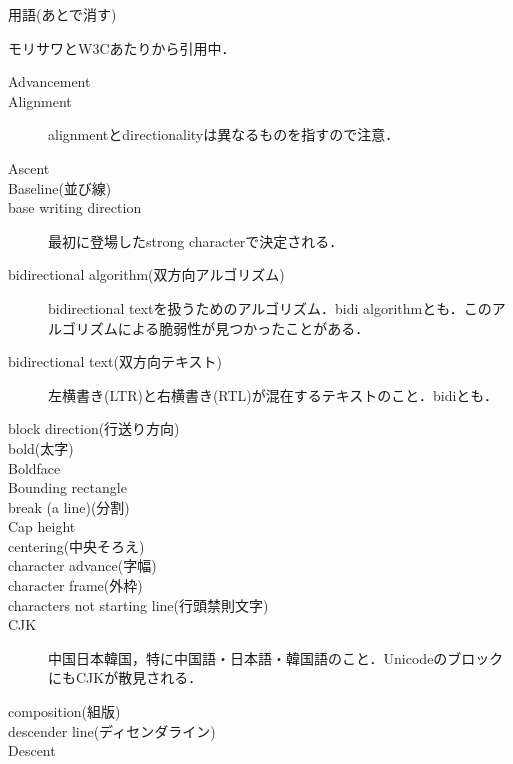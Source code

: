 用語(あとで消す)

モリサワとW3C\cite{www.w3.org:TR/2011/WD-jlreq-20111129/ja/}あたりから引用中．

\begin{description}
    \item[Advancement]
    \item[Alignment] alignmentとdirectionalityは異なるものを指すので注意\cite{developer.apple.com:videos/play/wwdc2016/232/}．
    \item[Ascent]
    \item[Baseline(並び線)]
    \item[base writing direction] 最初に登場したstrong characterで決定される\cite{developer.apple.com:videos/play/wwdc2016/232/}\cite{unicode.org:reports/tr9/}．
    \item[bidirectional algorithm(双方向アルゴリズム)] bidirectional textを扱うためのアルゴリズム\cite{www.w3.org:International/articles/inline-bidi-markup/uba-basics}．bidi algorithmとも．このアルゴリズムによる脆弱性が見つかったことがある\cite{jvndb.jvn.jp:ja/contents/2010/JVNDB-2010-002420.html}．
    \item[bidirectional text(双方向テキスト)] 左横書き(LTR)と右横書き(RTL)が混在するテキストのこと\cite{www.w3.org:International/articles/inline-bidi-markup/uba-basics}．bidiとも．
    \item[block direction(行送り方向)]
    \item[bold(太字)]
    \item[Boldface]
    \item[Bounding rectangle]
    \item[break (a line)(分割)]
    \item[Cap height]
    \item[centering(中央そろえ)]
    \item[character advance(字幅)]
    \item[character frame(外枠)]
    \item[characters not starting line(行頭禁則文字)]
    \item[CJK] 中国日本韓国，特に中国語・日本語・韓国語のこと．UnicodeのブロックにもCJKが散見される\cite{unicode.org:Public/UNIDATA/Blocks.txt}．
    \item[composition(組版)]
    \item[descender line(ディセンダライン)]
    \item[Descent]

\end{description}
